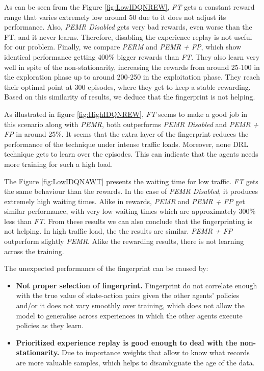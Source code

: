 \documentclass{llncs}
\begin{document}
As can be seen from the Figure \ref{fig:LowIDQNREW}, \textit{FT} gets a constant reward range that varies extremely low around 50 due to it does not adjust its performance. Also, \textit{PEMR Disabled} gets very bad rewards, even worse than the FT, and it never learns. Therefore, disabling the experience replay is not useful for our problem. Finally, we compare \textit{PERM} and \textit{PEMR + FP}, which show identical performance getting 400$\%$ bigger rewards than \textit{FT}. They also learn very well in spite of the non-stationarity, increasing the rewards from around 25-100 in the exploration phase up to around 200-250 in the exploitation phase. They reach their optimal point at 300 episodes, where they get to keep a stable rewarding. Based on this similarity of results, we deduce that the fingerprint is not helping.

As illustrated in figure \ref{fig:HighIDQNREW}, \textit{FT} seems to make a good job in this scenario along with \textit{PEMR}, both outperforms \textit{PEMR Disabled} and \textit{PEMR + FP} in around 25$\%$. It seems that the extra layer of the fingerprint reduces the performance of the technique under intense traffic loads. Moreover, none DRL technique gets to learn over the episodes. This can indicate that the agents needs more training for such a high load. 

The Figure \ref{fig:LowIDQNAWT} presents the waiting time for low traffic. \textit{FT} gets the same  behaviour than the rewards. In the case of \textit{PEMR Disabled}, it  produces extremely high waiting times. Alike in rewards, \textit{PEMR} and \textit{PEMR + FP} get similar performance, with very low waiting times which are approximately 300$\%$ less than \textit{FT}. From these results we can also conclude that the fingerprinting is not helping. In high traffic load, the the results are similar. \textit{PEMR + FP} outperform slightly \textit{PEMR}. Alike the rewarding results, there is not learning across the training.

The unexpected performance of the fingerprint can be caused by:  
\begin{itemize}
\item \textbf{Not proper selection of fingerprint.} Fingerprint do not correlate enough with the true value of state-action pairs given the other agents' policies and/or it does not vary smoothly over training, which does not allow the model to generalise across experiences in which the other agents execute policies as they learn.
\item \textbf{Prioritized experience replay is good enough to deal with the non-stationarity.} Due to importance weights that allow to know what records are more valuable samples, which helps to disambiguate the age of the data.
\end{itemize}
\end{document}
